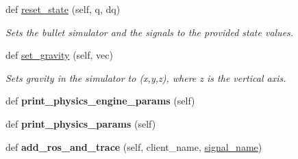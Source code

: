 \begin{DoxyCompactItemize}
\item 
def \hyperlink{classdg__blmc__robots_1_1solo_1_1solo__base__bullet_1_1SoloBaseRobot_af007664c1b5587db59a8ac8f5507fdc7}{reset\+\_\+state} (self, q, dq)
\begin{DoxyCompactList}\small\item\em Sets the bullet simulator and the signals to the provided state values. \end{DoxyCompactList}\item 
def \hyperlink{classdg__blmc__robots_1_1solo_1_1solo__base__bullet_1_1SoloBaseRobot_a57f5595c15e6c4382da54ac0e42370aa}{set\+\_\+gravity} (self, vec)
\begin{DoxyCompactList}\small\item\em Sets gravity in the simulator to (x,y,z), where z is the vertical axis. \end{DoxyCompactList}\item 
def {\bfseries print\+\_\+physics\+\_\+engine\+\_\+params} (self)\hypertarget{classdg__blmc__robots_1_1solo_1_1solo__base__bullet_1_1SoloBaseRobot_a600c906596d52aaaba4041f8371e59c7}{}\label{classdg__blmc__robots_1_1solo_1_1solo__base__bullet_1_1SoloBaseRobot_a600c906596d52aaaba4041f8371e59c7}

\item 
def {\bfseries print\+\_\+physics\+\_\+params} (self)\hypertarget{classdg__blmc__robots_1_1solo_1_1solo__base__bullet_1_1SoloBaseRobot_a91fff8ec09cce6d42012fc61d9f1d074}{}\label{classdg__blmc__robots_1_1solo_1_1solo__base__bullet_1_1SoloBaseRobot_a91fff8ec09cce6d42012fc61d9f1d074}

\item 
def {\bfseries add\+\_\+ros\+\_\+and\+\_\+trace} (self, client\+\_\+name, \hyperlink{classdg__blmc__robots_1_1solo_1_1solo__base__bullet_1_1SoloBaseRobot_ae7996643d55ee9abe0a7a844cdd64177}{signal\+\_\+name})\hypertarget{classdg__blmc__robots_1_1solo_1_1solo__base__bullet_1_1SoloBaseRobot_a8c63f4f8b1e18eb73e9e919347b78e28}{}\label{classdg__blmc__robots_1_1solo_1_1solo__base__bullet_1_1SoloBaseRobot_a8c63f4f8b1e18eb73e9e919347b78e28}

\end{DoxyCompactItemize}
